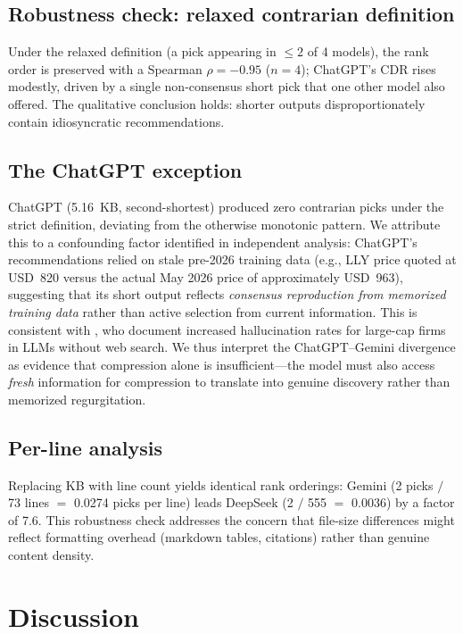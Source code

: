\documentclass[11pt,letterpaper]{article}
\begin{document}
\subsection{Robustness check: relaxed contrarian definition}\label{sec:robustness}

Under the relaxed definition (a pick appearing in $\leq 2$ of 4 models), the rank order is preserved with a Spearman $\rho=-0.95$ ($n=4$); ChatGPT's CDR rises modestly, driven by a single non-consensus short pick that one other model also offered. The qualitative conclusion holds: shorter outputs disproportionately contain idiosyncratic recommendations.

\subsection{The ChatGPT exception}\label{sec:chatgpt}

ChatGPT (5.16~KB, second-shortest) produced zero contrarian picks under the strict definition, deviating from the otherwise monotonic pattern. We attribute this to a confounding factor identified in independent analysis: ChatGPT's recommendations relied on stale pre-2026 training data (e.g., LLY price quoted at USD~820 versus the actual May 2026 price of approximately USD~963), suggesting that its short output reflects \textit{consensus reproduction from memorized training data} rather than active selection from current information. This is consistent with \citet{cheng2025}, who document increased hallucination rates for large-cap firms in LLMs without web search. We thus interpret the ChatGPT--Gemini divergence as evidence that compression alone is insufficient---the model must also access \textit{fresh} information for compression to translate into genuine discovery rather than memorized regurgitation.

\subsection{Per-line analysis}

Replacing KB with line count yields identical rank orderings: Gemini (2 picks $/$ 73 lines $=$ 0.0274 picks per line) leads DeepSeek (2 $/$ 555 $=$ 0.0036) by a factor of 7.6. This robustness check addresses the concern that file-size differences might reflect formatting overhead (markdown tables, citations) rather than genuine content density.

\section{Discussion}\label{sec:discussion}
\end{document}

